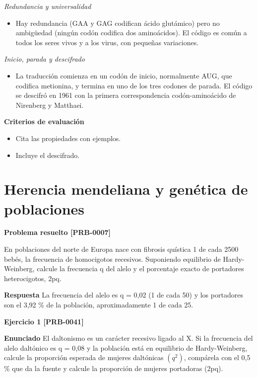 \documentclass{book}
\begin{document}
\noindent\textit{Redundancia y universalidad}
\begin{itemize}
\item Hay redundancia (GAA y GAG codifican ácido glutámico) pero no ambigüedad (ningún codón codifica dos aminoácidos). El código es común a todos los seres vivos y a los virus, con pequeñas variaciones.
\end{itemize}

\noindent\textit{Inicio, parada y descifrado}
\begin{itemize}
\item La traducción comienza en un codón de inicio, normalmente AUG, que codifica metionina, y termina en uno de los tres codones de parada. El código se descifró en 1961 con la primera correspondencia codón-aminoácido de Nirenberg y Matthaei.
\end{itemize}

\noindent\textbf{Criterios de evaluación}
\begin{itemize}
\item Cita las propiedades con ejemplos.
\item Incluye el descifrado.
\end{itemize}

\section{Herencia mendeliana y genética de poblaciones}

\noindent\textbf{Problema resuelto [PRB-0007]}

En poblaciones del norte de Europa nace con fibrosis quística 1 de cada 2500 bebés, la frecuencia de homocigotos recesivos. Suponiendo equilibrio de Hardy-Weinberg, calcule la frecuencia q del alelo y el porcentaje exacto de portadores heterocigotos, 2pq.


\noindent\textbf{Respuesta}
La frecuencia del alelo es q = 0,02 (1 de cada 50) y los portadores son el 3,92 \% de la población, aproximadamente 1 de cada 25.


\noindent\textbf{Ejercicio 1 [PRB-0041]}

\noindent\textbf{Enunciado}
El daltonismo es un carácter recesivo ligado al X. Si la frecuencia del alelo daltónico es q = 0,08 y la población está en equilibrio de Hardy-Weinberg, calcule la proporción esperada de mujeres daltónicas \((q^{2})\), compárela con el 0,5 \% que da la fuente y calcule la proporción de mujeres portadoras (2pq).
\end{document}
